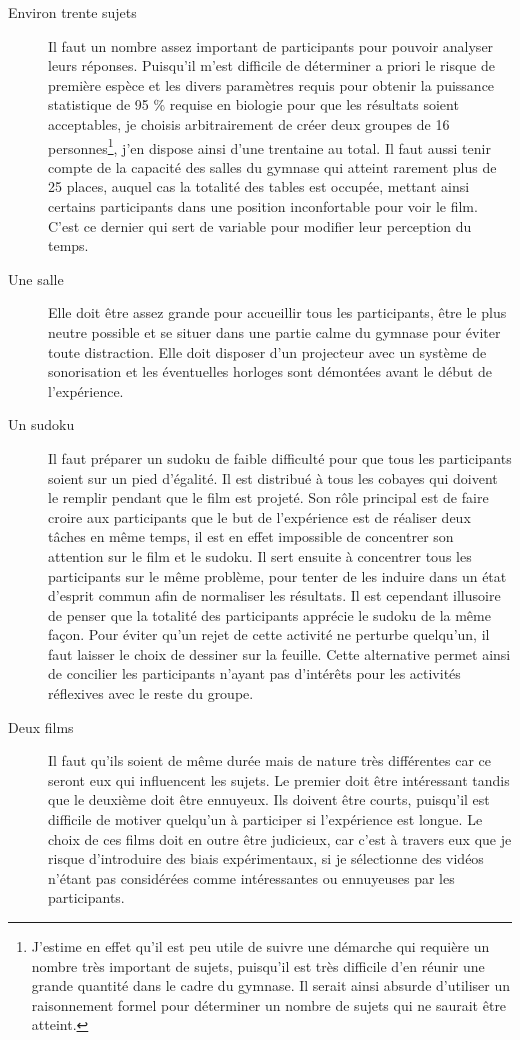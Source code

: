 \documentclass[12pt,fleqn,oneside,french,openany]{book} %
\begin{document}
\begin{description}
	\item[Environ trente sujets] Il faut un nombre assez important de participants pour pouvoir analyser leurs réponses. Puisqu'il m'est difficile de déterminer a priori le risque de première espèce et les divers paramètres requis pour obtenir la puissance statistique de 95 \% requise en biologie pour que les résultats soient acceptables, je choisis arbitrairement de créer deux groupes de 16 personnes\footnote{J'estime en effet qu'il est peu utile de suivre une démarche qui requière un nombre très important de sujets, puisqu'il est très difficile d'en réunir une grande quantité dans le cadre du gymnase. Il serait ainsi absurde d'utiliser un raisonnement formel pour déterminer un nombre de sujets qui ne saurait être atteint.}, j'en dispose ainsi d'une trentaine au total. Il faut aussi tenir compte de la capacité des salles du gymnase qui atteint rarement plus de 25 places, auquel cas la totalité des tables est occupée, mettant ainsi certains participants dans une position inconfortable pour voir le film. C'est ce dernier qui sert de variable pour modifier leur perception du temps.
	\item[Une salle] Elle doit être assez grande pour accueillir tous les participants, être le plus neutre possible et se situer dans une partie calme du gymnase pour éviter toute distraction. Elle doit disposer d'un projecteur avec un système de sonorisation et les éventuelles horloges sont démontées avant le début de l'expérience.
	\item[Un sudoku] Il faut préparer un sudoku de faible difficulté pour que tous les participants soient sur un pied d'égalité. Il est distribué à tous les cobayes qui doivent le remplir pendant que le film est projeté. Son rôle principal est de faire croire aux participants que le but de l'expérience est de réaliser deux tâches en même temps, il est en effet impossible de concentrer son attention sur le film et le sudoku. Il sert ensuite à concentrer tous les participants sur le même problème, pour tenter de les induire dans un état d'esprit commun afin de normaliser les résultats. Il est cependant illusoire de penser que la totalité des participants apprécie le sudoku de la même façon. Pour éviter qu'un rejet de cette activité ne perturbe quelqu'un, il faut laisser le choix de dessiner sur la feuille. Cette alternative permet ainsi de concilier les participants n'ayant pas d'intérêts pour les activités réflexives avec le reste du groupe.
	\item[Deux films] Il faut qu'ils soient de même durée mais de nature très différentes car ce seront eux qui influencent les sujets. Le premier doit être intéressant tandis que le deuxième doit être ennuyeux. Ils doivent être courts, puisqu'il est difficile de motiver quelqu'un à participer si l'expérience est longue. Le choix de ces films doit en outre être judicieux, car c'est à travers eux que je risque d'introduire des biais expérimentaux, si je sélectionne des vidéos n'étant pas considérées comme intéressantes ou ennuyeuses par les participants. 


\end{description}
\end{document}
